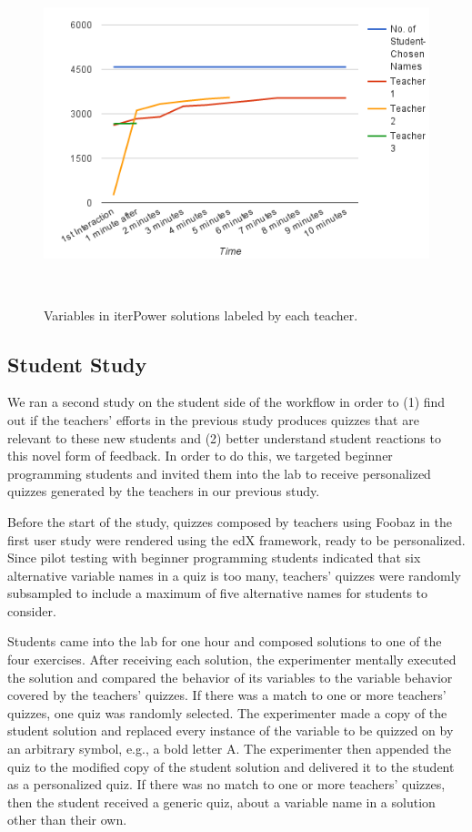 {{\begin{figure}
\begin{minipage}{1\columnwidth}
\centering
\includegraphics[width=0.9\columnwidth]{Body/figures/foobaz/variableCoverageNoTitle.png}
\caption{Variables in iterPower solutions labeled by each teacher.}~\label{fig:variableCoverage}
\end{minipage}
\end{figure}

\subsection{Student Study}

We ran a second study on the student side of the workflow in order to (1) find out if the teachers' efforts in the previous study produces quizzes that are relevant to these new students and (2) better understand student reactions to this novel form of feedback. In order to do this, we targeted beginner programming students and invited them into the lab to receive personalized quizzes generated by the teachers in our previous study.

Before the start of the study, quizzes composed by teachers using Foobaz in the first user study were rendered using the edX framework, ready to be personalized. Since pilot testing with beginner programming students indicated that six alternative variable names in a quiz is too many, teachers' quizzes were randomly subsampled to include a maximum of five alternative names for students to consider. 

Students came into the lab for one hour and composed solutions to one of the four exercises. After receiving each solution, the experimenter mentally executed the solution and compared the behavior of its variables to the variable behavior covered by the teachers' quizzes. If there was a match to one or more teachers' quizzes, one quiz was randomly selected. The experimenter made a copy of the student solution and replaced every instance of the variable to be quizzed on by an arbitrary symbol, e.g., a bold letter A. The experimenter then appended the quiz to the modified copy of the student solution and delivered it to the student as a personalized quiz. If there was no match to one or more teachers' quizzes, then the student received a generic quiz, about a variable name in a solution other than their own.

}}
